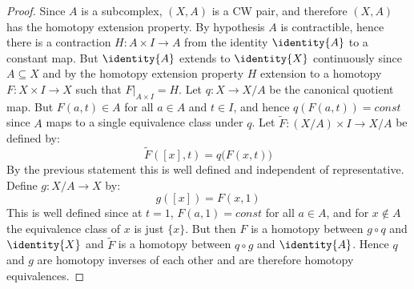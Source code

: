         \begin{proof}
            Since $A$ is a subcomplex, $(X,A)$ is a CW pair, and
            therefore $(X,A)$ has the homotopy extension property. By
            hypothesis $A$ is contractible, hence there is a contraction
            $H:A\times{I}\rightarrow{A}$ from the identity
            $\identity{A}$ to a constant map. But $\identity{A}$ extends
            to $\identity{X}$ continuously since $A\subseteq{X}$ and
            by the homotopy extension property $H$ extension to a
            homotopy $F:X\times{I}\rightarrow{X}$ such that
            $F|_{A\times{I}}=H$. Let $q:X\rightarrow{X}/A$ be the
            canonical quotient map. But $F(a,t)\in{A}$ for all $a\in{A}$
            and $t\in{I}$, and hence $q(F(a,t))=const$ since $A$ maps to
            a single equivalence class under $q$. Let
            $\tilde{F}:(X/A)\times{I}\rightarrow{X}/A$ be defined by:
            \begin{equation}
                \tilde{F}([x],t)=q\big(F(x,t)\big)
            \end{equation}
            By the previous statement this is well defined and
            independent of representative. Define $g:X/A\rightarrow{X}$
            by:
            \begin{equation}
                g([x])=F(x,1)
            \end{equation}
            This is well defined since at $t=1$, $F(a,1)=const$ for all
            $a\in{A}$, and for $x\notin{A}$ the equivalence class of $x$
            is just $\{x\}$. But then $F$ is a homotopy between
            $g\circ{q}$ and $\identity{X}$ and $\tilde{F}$ is a homotopy
            between $q\circ{g}$ and $\identity{A}$. Hence $q$ and $g$
            are homotopy inverses of each other and are therefore
            homotopy equivalences.
        \end{proof}
